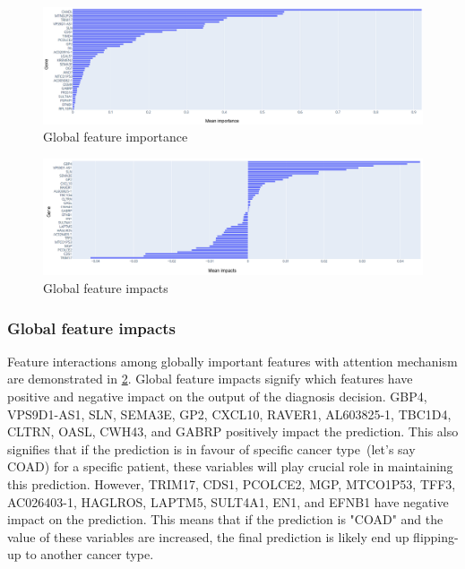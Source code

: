\begin{figure}
    \centering
	\includegraphics[scale=0.9]{images/global_fi_1.png}
	\caption{Global feature importance}
    \label{fig:global_feature_importance}
\end{figure}

\begin{figure}
    \centering
	\includegraphics[scale=0.9]{images/global_fi_2.png}
	\caption{Global feature impacts}
    \label{fig:global_feature_impacts}
\end{figure}

\subsubsection{Global feature impacts}
Feature interactions among globally important features with attention mechanism are demonstrated in \cref{fig:global_feature_impacts}. Global feature impacts signify which features have positive and negative impact on the output of the diagnosis decision. GBP4, VPS9D1-AS1, SLN, SEMA3E, GP2, CXCL10, RAVER1, AL603825-1, TBC1D4, CLTRN, OASL, CWH43, and GABRP positively impact the prediction. This also signifies that if the prediction is in favour of specific cancer type~(let's say COAD) for a specific patient, these variables will play crucial role in maintaining this prediction. However, TRIM17, CDS1, PCOLCE2, MGP, MTCO1P53, TFF3, AC026403-1, HAGLROS, LAPTM5, SULT4A1, EN1, and EFNB1 have negative impact on the prediction. This means that if the prediction is "COAD" and the value of these variables are increased, the final prediction is likely end up flipping-up to another cancer type.

